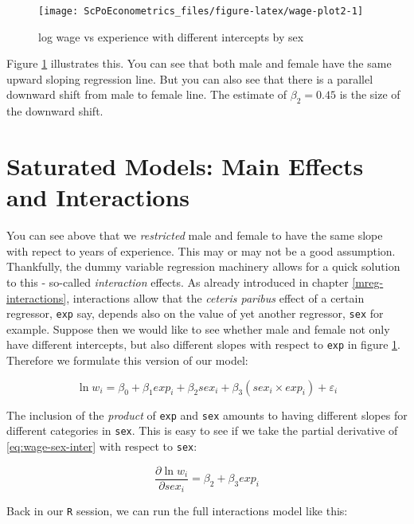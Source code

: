 \documentclass[]{book}
\theoremstyle{definition}
\theoremstyle{definition}
\theoremstyle{definition}
\theoremstyle{remark}
\begin{document}
\begin{figure}

{\centering \texttt{[image: ScPoEconometrics\_files/figure-latex/wage-plot2-1]} 

}

\caption{log wage vs experience with different intercepts by sex}\label{fig:wage-plot2}
\end{figure}

Figure \ref{fig:wage-plot2} illustrates this. You can see that both male
and female have the same upward sloping regression line. But you can
also see that there is a parallel downward shift from male to female
line. The estimate of \(\beta_2 = 0.45\) is the size of the downward
shift.

\section{Saturated Models: Main Effects and
Interactions}\label{saturated-models-main-effects-and-interactions}

You can see above that we \emph{restricted} male and female to have the
same slope with repect to years of experience. This may or may not be a
good assumption. Thankfully, the dummy variable regression machinery
allows for a quick solution to this - so-called \emph{interaction}
effects. As already introduced in chapter \ref{mreg-interactions},
interactions allow that the \emph{ceteris paribus} effect of a certain
regressor, \texttt{exp} say, depends also on the value of yet another
regressor, \texttt{sex} for example. Suppose then we would like to see
whether male and female not only have different intercepts, but also
different slopes with respect to \texttt{exp} in figure
\ref{fig:wage-plot2}. Therefore we formulate this version of our model:

\[
\ln w_i = \beta_0 + \beta_1 exp_i + \beta_2 sex_i + \beta_3 (sex_i \times exp_i) + \varepsilon_i \label{eq:wage-sex-inter}
\]

The inclusion of the \emph{product} of \texttt{exp} and \texttt{sex}
amounts to having different slopes for different categories in
\texttt{sex}. This is easy to see if we take the partial derivative of
\eqref{eq:wage-sex-inter} with respect to \texttt{sex}:

\[
\frac{\partial \ln w_i}{\partial sex_i} = \beta_2 + \beta_3 exp_i \label{eq:wage-sex-inter-deriv}
\]

Back in our \texttt{R} session, we can run the full interactions model
like this:
\end{document}
